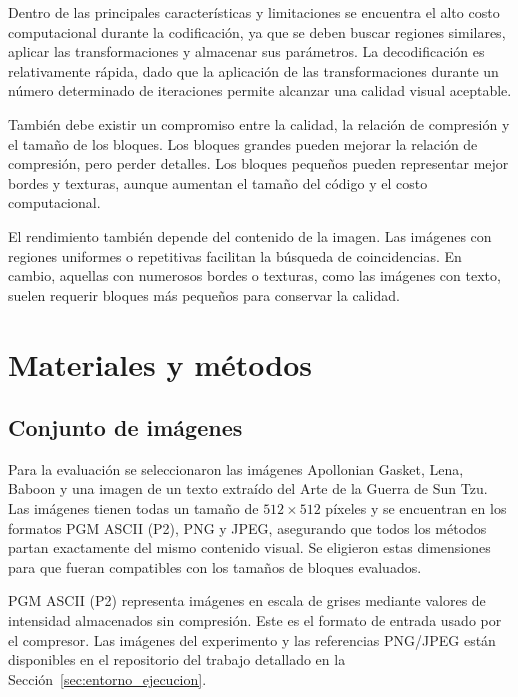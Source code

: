 \documentclass[a4paper]{llncs}
\begin{document}
Dentro de las principales características y limitaciones se encuentra el alto costo computacional durante la codificación, ya que se deben buscar regiones similares, aplicar las transformaciones y almacenar sus parámetros. La decodificación es relativamente rápida, dado que la aplicación de las transformaciones durante un número determinado de iteraciones permite alcanzar una calidad visual aceptable.

También debe existir un compromiso entre la calidad, la relación de compresión y el tamaño de los bloques. Los bloques grandes pueden mejorar la relación de compresión, pero perder detalles. Los bloques pequeños pueden representar mejor bordes y texturas, aunque aumentan el tamaño del código y el costo computacional.

El rendimiento también depende del contenido de la imagen. Las imágenes con regiones uniformes o repetitivas facilitan la búsqueda de coincidencias. En cambio, aquellas con numerosos bordes o texturas, como las imágenes con texto, suelen requerir bloques más pequeños para conservar la calidad.

\section{Materiales y métodos}

\subsection{Conjunto de imágenes}

Para la evaluación se seleccionaron las imágenes Apollonian Gasket, Lena, Baboon y una imagen de un texto extraído del Arte de la Guerra de Sun Tzu. Las imágenes tienen todas un tamaño de $512\times512$ píxeles y se encuentran en los formatos PGM ASCII (P2)\cite{netpbmPGM}, PNG y JPEG, asegurando que todos los métodos partan exactamente del mismo contenido visual. Se eligieron estas dimensiones para que fueran compatibles con los tamaños de bloques evaluados.

PGM ASCII (P2) representa imágenes en escala de grises mediante valores de intensidad almacenados sin compresión. Este es el formato de entrada usado por el compresor. Las imágenes del experimento y las referencias PNG/JPEG están disponibles en el repositorio del trabajo detallado en la Sección~\ref{sec:entorno_ejecucion}.
\end{document}
